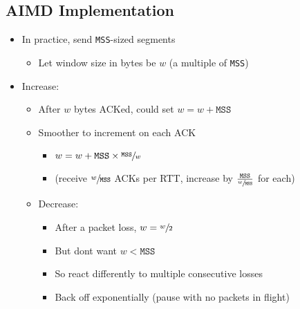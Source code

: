 \subsection{AIMD Implementation}
\begin{itemize}[nosep]
    \item In practice, send \texttt{MSS}-sized segments
          \begin{itemize}[nosep]
              \item Let window size in bytes be $w$ (a multiple of \texttt{MSS})
          \end{itemize}
    \item Increase:
          \begin{itemize}[nosep]
              \item After $w$ bytes ACKed, could set $w = w + \texttt{MSS}$
              \item Smoother to increment on each ACK
                    \begin{itemize}[nosep]
                        \item $w = w + \texttt{MSS} \times \sfrac{\texttt{MSS}}{w}$
                        \item (receive $\sfrac{w}{\texttt{MSS}}$ ACKs per RTT, increase by $\frac{\texttt{MSS}}{\sfrac{w}{\texttt{MSS}}}$ for each)
                    \end{itemize}
              \item Decrease:
                    \begin{itemize}[nosep]
                        \item After a packet loss, $w = \sfrac{w}{2}$
                        \item But dont want $w < \texttt{MSS}$
                        \item So react differently to multiple consecutive losses
                        \item Back off exponentially (pause with no packets in flight)
                    \end{itemize}
          \end{itemize}
\end{itemize}


